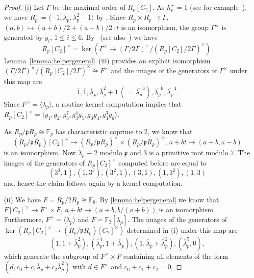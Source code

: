 \documentclass[11pt,leqno,a4paper]{amsart}
\newcommand{\F}{\mathbb{F}}
\theoremstyle{definition}
\theoremstyle{remark}
\theoremstyle{custom}
\begin{document}
\begin{proof}
(i) Let $\Gamma$ be the maximal order of $R_p[C_2]$. As $h_p^+ = 1$ (see for example~\cite{Linden1992}), we have $R_p^\times = \langle -1, \lambda_p, \lambda_p^2 - 1 \rangle$ by \cite[Lemma 8.1, Theorem 8.2]{Washington1997}.
Since $R_p \times R_p \to \Gamma$, $(a, b) \mapsto (a + b)/2 + (a - b)/2 \cdot t$ is an isomorphism,
the group $\Gamma^\times$ is generated by $g_i$, $1 \leq i \leq 6$.
By~\cite[Satz 10]{HK1994} (see also~\cite[Proposition 6.8]{JP2020}) we have
    \[ R_p[C_2]^\times = \ker(\Gamma^\times \to (\Gamma/2\Gamma)^\times/(R_p[C_2]/2\Gamma)^\times). \]
    Lemma~\ref{lemma:helpergeneral}~(iii) provides an explicit isomorphism
    $(\Gamma/2\Gamma)^\times/(R_p[C_2]/2\Gamma)^\times \cong F^\times$
    and the images of the generators of $\Gamma^\times$ under this map are
    \[ \overline 1, \overline 1, \overline \lambda_p, \overline \lambda_p^2 + 1 \, (\,= \overline{\lambda_p}^3), \overline{\lambda_p}^6, \overline{\lambda_p}^4. \]
    Since $F^\times = \langle \overline{\lambda_p} \rangle$, a routine kernel computation implies that
    $R_p[C_2]^\times = \langle g_1, g_2, g_3^7, g_3^4 g_5, g_3 g_4, g_3^3 g_6 \rangle$.
    
As $R_p/\mathfrak p R_p \cong \F_p$ has characteristic coprime to $2$, we know that
\[ (R_p/\mathfrak p R_p)[C_2]^\times \to (R_p/\mathfrak p R_p)^\times \times (R_p/\mathfrak p R_p)^\times, \, a + bt \mapsto (a + b, a - b) \]
is an isomorphism. Now $\lambda_p \equiv 2$ modulo $\mathfrak p$ and $3$ is a primitive root modulo $7$. The images of the generators of $R_p[C_2]^\times$ computed before are equal to
\[ (3^3, 1), (1, 3^3), (3^2, 1), (3, 1), (1, 3^2), (1, 3) \]
and hence the claim follows again by a kernel computation.

(ii) We have $F = R_p/2R_p \cong \F_{8}$. By \cref{lemma:helpergeneral} we know that $F[C_2]^\times \to F^\times \times F, \ a + bt \to (a + b, b/(a + b))$
is an isomorphism. Furthermore, $F^\times = \langle \overline{\lambda_p} \rangle$ and $F = \F_2[\overline \lambda_p]$.
The images of the generators of $\ker(R_p[C_2]^\times \to (R_p/\mathfrak p R_p)[C_2]^\times)$ determined in (i) under this map are
\[ (1, 1 + \overline \lambda_p^2), (\overline \lambda_p^4, 1 + \overline \lambda_p), (1, \overline \lambda_p + \overline \lambda_p^2), (\overline \lambda_p^5, 0), \]
which generate the subgroup of $F^\times \times F$ containing all elements of the form $(d, c_0 + c_1 \overline\lambda_p + c_2 \overline \lambda_p^2)$ with $d \in F^\times$ and $c_0 + c_1 + c_2 = 0$.
\end{proof}
\end{document}
